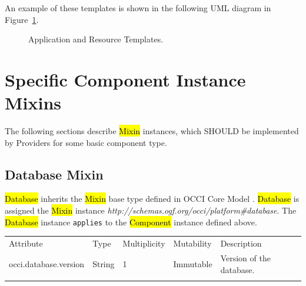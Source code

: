 \documentclass[10pt,a4paper]{article}
\begin{document}
An example of these templates is shown in the following UML diagram in Figure~\ref{fig:templates}.

\begin{figure}[!h]
	{\centering {} \par}
	\caption{Application and Resource Templates.}
	\label{fig:templates}
\end{figure}

\section{Specific Component Instance Mixins}
The following sections describe \hl{Mixin} instances, which SHOULD be implemented by Providers for some basic component type.

\subsection{Database Mixin}

\hl{Database} inherits the \hl{Mixin} base type defined in OCCI Core Model \cite{occi:core}. \hl{Database} is assigned the \hl{Mixin} instance \textit{http://schemas.ogf.org/occi/platform\#database}. The \hl{Database} instance \texttt{applies} to the \hl{Component} instance defined above.

{
	\begin{tabular}{lp{2.5cm}p{1cm}lp{5cm}}
	\toprule
	Attribute&Type&Multi\-plicity&Mutability&Description\\
	\colrule
	occi.database.version & String & 1 & Immutable & Version of the database.\\
	\botrule
	\end{tabular}
}
\end{document}
